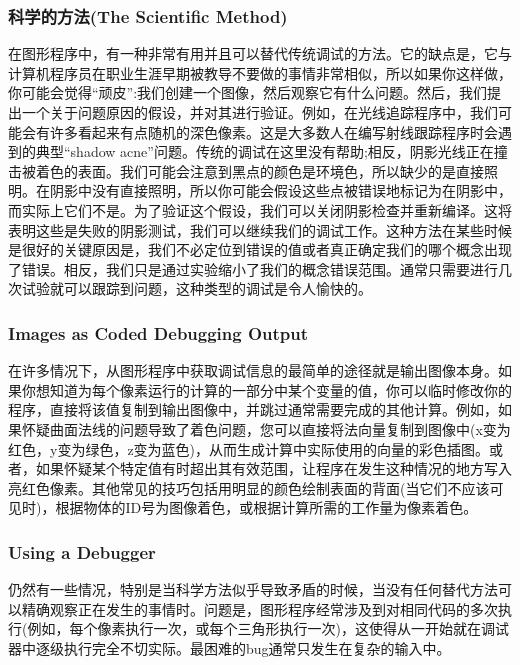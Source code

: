 \subsubsection*{\textcolor{structure3}{科学的方法(The Scientific Method)}}

在图形程序中，有一种非常有用并且可以替代传统调试的方法。它的缺点是，它与计算机程序员在职业生涯早期被教导不要做的事情非常相似，所以如果你这样做，你可能会觉得“顽皮”:我们创建一个图像，然后观察它有什么问题。然后，我们提出一个关于问题原因的假设，并对其进行验证。例如，在光线追踪程序中，我们可能会有许多看起来有点随机的深色像素。这是大多数人在编写射线跟踪程序时会遇到的典型“shadow acne”问题。传统的调试在这里没有帮助;相反，阴影光线正在撞击被着色的表面。我们可能会注意到黑点的颜色是环境色，所以缺少的是直接照明。在阴影中没有直接照明，所以你可能会假设这些点被错误地标记为在阴影中，而实际上它们不是。为了验证这个假设，我们可以关闭阴影检查并重新编译。这将表明这些是失败的阴影测试，我们可以继续我们的调试工作。这种方法在某些时候是很好的关键原因是，我们不必定位到错误的值或者真正确定我们的哪个概念出现了错误。相反，我们只是通过实验缩小了我们的概念错误范围。通常只需要进行几次试验就可以跟踪到问题，这种类型的调试是令人愉快的。

\subsubsection*{\textcolor{structure3}{Images as Coded Debugging Output}}

在许多情况下，从图形程序中获取调试信息的最简单的途径就是输出图像本身。如果你想知道为每个像素运行的计算的一部分中某个变量的值，你可以临时修改你的程序，直接将该值复制到输出图像中，并跳过通常需要完成的其他计算。例如，如果怀疑曲面法线的问题导致了着色问题，您可以直接将法向量复制到图像中(x变为红色，y变为绿色，z变为蓝色)，从而生成计算中实际使用的向量的彩色插图。或者，如果怀疑某个特定值有时超出其有效范围，让程序在发生这种情况的地方写入亮红色像素。其他常见的技巧包括用明显的颜色绘制表面的背面(当它们不应该可见时)，根据物体的ID号为图像着色，或根据计算所需的工作量为像素着色。

\subsubsection*{\textcolor{structure3}{Using a Debugger}}

仍然有一些情况，特别是当科学方法似乎导致矛盾的时候，当没有任何替代方法可以精确观察正在发生的事情时。问题是，图形程序经常涉及到对相同代码的多次执行(例如，每个像素执行一次，或每个三角形执行一次)，这使得从一开始就在调试器中逐级执行完全不切实际。最困难的bug通常只发生在复杂的输入中。

